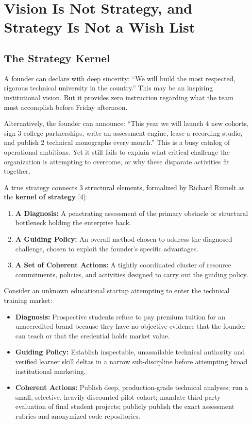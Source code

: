 \section{Vision Is Not Strategy, and Strategy Is Not a Wish List}

\subsection{The Strategy Kernel}

A founder can declare with deep sincerity: ``We will build the most respected, rigorous technical university in the country.'' This may be an inspiring institutional vision. But it provides zero instruction regarding what the team must accomplish before Friday afternoon.

Alternatively, the founder can announce: ``This year we will launch 4 new cohorts, sign 3 college partnerships, write an assessment engine, lease a recording studio, and publish 2 technical monographs every month.'' This is a busy catalog of operational ambitions. Yet it still fails to explain what critical challenge the organization is attempting to overcome, or why these disparate activities fit together.

A true strategy connects 3 structural elements, formalized by Richard Rumelt as the \textbf{kernel of strategy} [4]:

\begin{enumerate}[leftmargin=12pt,itemsep=2.5pt,topsep=1pt,parsep=0pt]
  \item \textbf{A Diagnosis:} A penetrating assessment of the primary obstacle or structural bottleneck holding the enterprise back.
  \item \textbf{A Guiding Policy:} An overall method chosen to address the diagnosed challenge, chosen to exploit the founder's specific advantages.
  \item \textbf{A Set of Coherent Actions:} A tightly coordinated cluster of resource commitments, policies, and activities designed to carry out the guiding policy.
\end{enumerate}

Consider an unknown educational startup attempting to enter the technical training market:

\begin{itemize}[leftmargin=11pt,itemsep=1.5pt,topsep=1.5pt,parsep=0pt]
  \item \textbf{Diagnosis:} Prospective students refuse to pay premium tuition for an unaccredited brand because they have no objective evidence that the founder can teach or that the credential holds market value.
  \item \textbf{Guiding Policy:} Establish inspectable, unassailable technical authority and verified learner skill deltas in a narrow sub-discipline before attempting broad institutional marketing.
  \item \textbf{Coherent Actions:} Publish deep, production-grade technical analyses; run a small, selective, heavily discounted pilot cohort; mandate third-party evaluation of final student projects; publicly publish the exact assessment rubrics and anonymized code repositories.
\end{itemize}

